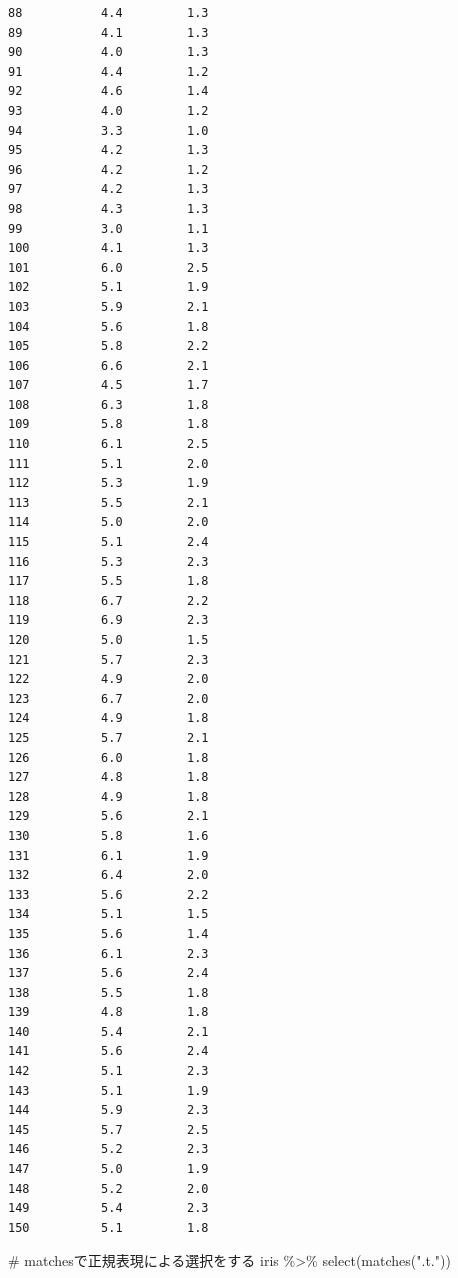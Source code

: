 \documentclass[
  a4paper,
]{ltjsbook}
\newenvironment{Shaded}{\begin{snugshade}}{\end{snugshade}}
\newcommand{\CommentTok}[1]{\textcolor[rgb]{0.37,0.37,0.37}{#1}}
\newcommand{\FunctionTok}[1]{\textcolor[rgb]{0.28,0.35,0.67}{#1}}
\newcommand{\NormalTok}[1]{\textcolor[rgb]{0.00,0.23,0.31}{#1}}
\newcommand{\SpecialCharTok}[1]{\textcolor[rgb]{0.37,0.37,0.37}{#1}}
\newcommand{\StringTok}[1]{\textcolor[rgb]{0.13,0.47,0.30}{#1}}
\begin{document}
\begin{verbatim}
88           4.4         1.3
89           4.1         1.3
90           4.0         1.3
91           4.4         1.2
92           4.6         1.4
93           4.0         1.2
94           3.3         1.0
95           4.2         1.3
96           4.2         1.2
97           4.2         1.3
98           4.3         1.3
99           3.0         1.1
100          4.1         1.3
101          6.0         2.5
102          5.1         1.9
103          5.9         2.1
104          5.6         1.8
105          5.8         2.2
106          6.6         2.1
107          4.5         1.7
108          6.3         1.8
109          5.8         1.8
110          6.1         2.5
111          5.1         2.0
112          5.3         1.9
113          5.5         2.1
114          5.0         2.0
115          5.1         2.4
116          5.3         2.3
117          5.5         1.8
118          6.7         2.2
119          6.9         2.3
120          5.0         1.5
121          5.7         2.3
122          4.9         2.0
123          6.7         2.0
124          4.9         1.8
125          5.7         2.1
126          6.0         1.8
127          4.8         1.8
128          4.9         1.8
129          5.6         2.1
130          5.8         1.6
131          6.1         1.9
132          6.4         2.0
133          5.6         2.2
134          5.1         1.5
135          5.6         1.4
136          6.1         2.3
137          5.6         2.4
138          5.5         1.8
139          4.8         1.8
140          5.4         2.1
141          5.6         2.4
142          5.1         2.3
143          5.1         1.9
144          5.9         2.3
145          5.7         2.5
146          5.2         2.3
147          5.0         1.9
148          5.2         2.0
149          5.4         2.3
150          5.1         1.8
\end{verbatim}

\begin{Shaded}
\begin{Highlighting}[]
\CommentTok{\# matchesで正規表現による選択をする}
\NormalTok{iris }\SpecialCharTok{\%\textgreater{}\%} \FunctionTok{select}\NormalTok{(}\FunctionTok{matches}\NormalTok{(}\StringTok{".t."}\NormalTok{))}
\end{Highlighting}
\end{Shaded}
\end{document}
